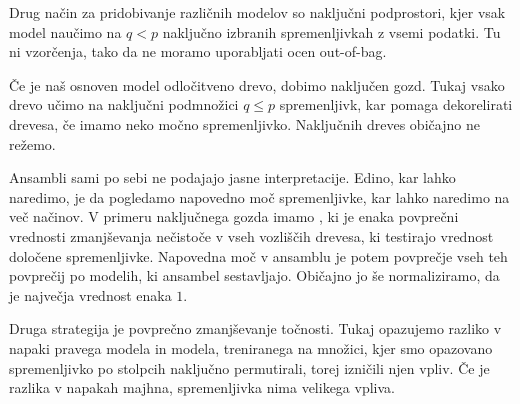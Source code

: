 
Drug način za pridobivanje različnih modelov so naključni podprostori, kjer vsak
model naučimo na $q < p$ naključno izbranih spremenljivkah z vsemi podatki.
Tu ni vzorčenja, tako da ne moramo uporabljati ocen out-of-bag.

Če je naš osnoven model odločitveno drevo, dobimo naključen gozd.
Tukaj vsako drevo učimo na naključni podmnožici $q \le p$ spremenljivk, kar
pomaga dekorelirati drevesa, če imamo neko močno spremenljivko.
Naključnih dreves običajno ne režemo.


Ansambli sami po sebi ne podajajo jasne interpretacije.
Edino, kar lahko naredimo, je da pogledamo napovedno moč spremenljivke, kar
lahko naredimo na več načinov.
V primeru naključnega gozda imamo , ki
je enaka povprečni vrednosti zmanjševanja nečistoče v vseh vozliščih drevesa, ki
testirajo vrednost določene spremenljivke.
Napovedna moč v ansamblu je potem povprečje vseh teh povprečij po modelih, ki
ansambel sestavljajo.
Običajno jo še normaliziramo, da je največja vrednost enaka $1$.


Druga strategija je povprečno zmanjševanje točnosti.
Tukaj opazujemo razliko v napaki pravega modela in modela, treniranega na
množici, kjer smo opazovano spremenljivko po stolpcih naključno permutirali,
torej izničili njen vpliv.
Če je razlika v napakah majhna, spremenljivka nima velikega vpliva.


